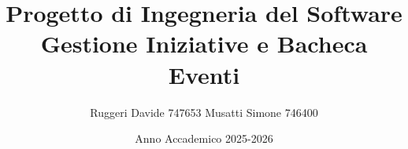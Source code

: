 \documentclass[12pt,a4paper]{report}
\title{
    \vspace{2cm}
    \textbf{Progetto di Ingegneria del Software}\\
    \large{Gestione Iniziative e Bacheca Eventi}
}
\author{
    Ruggeri Davide 747653
    Musatti Simone 746400
    }
\date{Anno Accademico 2025-2026}
\begin{document}
\maketitle

\renewcommand{\contentsname}{Indice}
\tableofcontents
\newpage








\end{document}
